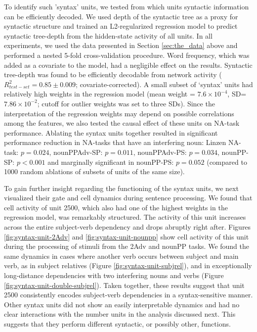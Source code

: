 To identify such 'syntax' units, we tested from which units syntactic information can be efficiently decoded. We used depth of the syntactic tree as a proxy for syntactic structure \cite{Nelson:etal:2017} and trained an L2-regularized regression model to predict syntactic tree-depth from the hidden-state activity of all units. In all experiments, we used the data presented in Section \ref{sec:the_data} above and performed a nested 5-fold cross-validation procedure. Word frequency, which was added as a covariate to the model, had a negligible effect on the results. Syntactic tree-depth was found to be efficiently decodable from network activity ($R^2_{test-set}=0.85\pm0.009$; covariate-corrected). A small subset of `syntax' units had relatively high weights in the regression model (mean weight = $7.6\times{}10^{-4}$, SD=$7.86\times{}10^{-2}$; cutoff for outlier weights was set to three SDs). Since the interpretation of the regression weights may depend on possible correlations among the features, we also tested the causal effect of these units on NA-task performance. Ablating the syntax units together resulted in significant performance reduction in NA-tasks that have an interfering noun: Linzen NA-task: $p=0.024$, nounPPAdv-SP: $p=0.011$, nounPPAdv-PS: $p=0.034$, nounPP-SP: $p<0.001$ and marginally significant in nounPP-PS: $p=0.052$ (compared to 1000 random ablations of subsets of units of the same size).

To gain further insight regarding the functioning of the syntax units, we next visualized their gate and cell dynamics during sentence processing. We found that cell activity of unit \unit{2}{500}, which also had one of the highest weights in the regression model, was remarkably structured. The activity of
this unit increases across the entire subject-verb dependency and drops abruptly right after. Figures
\ref{fig:syntax-unit-2Adv} and \ref{fig:syntax-unit-nounpp} show cell activity of this unit during the processing of stimuli from the 2Adv and nounPP tasks. We found the same dynamics in cases where another
verb occurs between subject and main verb, as in subject relatives (Figure \ref{fig:syntax-unit-subjrel}), and in exceptionally long-distance dependencies with two interfering nouns and verbs (Figure \ref{fig:syntax-unit-double-subjrel}). Taken together, these results suggest that unit \unit{2}{500} consistently encodes subject-verb dependencies in a syntax-sensitive manner. Other syntax units did not show an easily interpretable dynamics and had no clear interactions with the number units in the analysis discussed next. This suggests that they perform different syntactic, or possibly other, functions.

